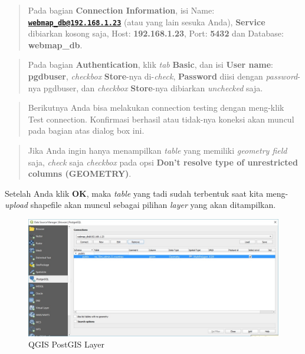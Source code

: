 \documentclass[]{book}
\begin{document}
\begin{itemize}
  \begin{quote}
  Pada bagian \textbf{Connection Information}, isi Name: \textbf{\href{mailto:webmap_db@192.168.1.23}{\nolinkurl{webmap\_db@192.168.1.23}}} (atau yang lain sesuka Anda), \textbf{Service} dibiarkan kosong saja, Host: \textbf{192.168.1.23}, Port: \textbf{5432} dan Database: \textbf{webmap\_db}.
  \end{quote}

  \begin{quote}
  Pada bagian \textbf{Authentication}, klik \emph{tab} \textbf{Basic}, dan isi \textbf{User name}: \textbf{pgdbuser}, \emph{checkbox} \textbf{Store}-nya di-\emph{check}, \textbf{Password} diisi dengan \emph{password}-nya pgdbuser, dan \emph{checkbox} \textbf{Store}-nya dibiarkan \emph{unchecked} saja.
  \end{quote}

  \begin{quote}
  Berikutnya Anda bisa melakukan connection testing dengan meng-klik Test connection. Konfirmasi berhasil atau tidak-nya koneksi akan muncul pada bagian atas dialog box ini.
  \end{quote}

  \begin{quote}
  Jika Anda ingin hanya menampilkan \emph{table} yang memiliki \emph{geometry field} saja, \emph{check} saja \emph{checkbox} pada opsi \textbf{Don't resolve type of unrestricted columns (GEOMETRY)}.
  \end{quote}

  Setelah Anda klik \textbf{OK}, maka \emph{table} yang tadi sudah terbentuk saat kita meng-\emph{upload} shapefile akan muncul sebagai pilihan \emph{layer} yang akan ditampilkan.

  \begin{figure}
  \centering
  \includegraphics{./img/qgis-select-layers.jpg}
  \caption{QGIS PostGIS Layer}
  \end{figure}


\end{itemize}
\end{document}
